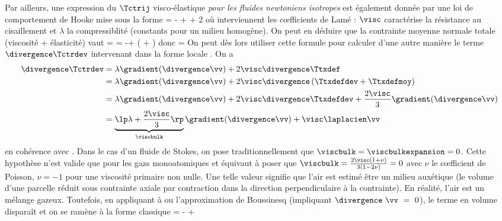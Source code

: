 Par ailleurs, une expression du $\Tctrij$ visco-élastique \emph{pour les fluides newtoniens isotropes} est également donnée par une loi de comportement de Hooke mise sous la forme
\beq \Tctrij = - \kro \pression + \lambda \kro \Ttxdefkk + 2 \visc \Ttxdefij \eeq
où interviennent les cœfficients de Lamé : $\visc$ caractérise la résistance au cisaillement et $\lambda$ la compressiblité (constants pour un milieu homogène). On peut en déduire que la contrainte moyenne normale totale (viscosité + élasticité) vaut
\beq \Tctrmoy =  = -\pression + \left ( \lambda +  \visc \right ) \Ttxdefkk \eeq
donc \beq \viscbulk = \viscbulkexpansion \eeq
On peut dès lors utiliser cette formule pour calculer d'une autre manière le terme $\divergence \Tctrdev$ intervenant dans la forme locale . On a
\begin{align}
\divergence \Tctrdev
  & = \lambda \gradient ( \divergence \vv) + 2 \visc \divergence \Ttxdef \notag \\
  & = \lambda \gradient ( \divergence \vv) + 2 \visc \divergence \left ( \Ttxdefdev + \Ttxdefmoy \right ) \notag \\
  & = \lambda \gradient ( \divergence \vv) + 2 \visc \divergence \Ttxdefdev + \frac{2\visc}{3} \gradient ( \divergence \vv ) \notag \\
  & = \underbrace{\lp \lambda + \frac{2\visc}{3} \rp}_{\viscbulk} \gradient ( \divergence \vv) + \visc \laplacien \vv \label{eq:dynamique-finale}
\end{align}
en cohérence avec .
Dans le cas d'un fluide de Stokes, on pose traditionnellement que $\viscbulk = \viscbulkexpansion = 0$.
Cette hypothèse n'est valide que pour les gazs monoatomiques et équivaut à poser que $\viscbulk = \frac{2 \visc(1 + \nu)}{3(1 - 2\nu)} = 0$ avec $\nu$ le cœfficient de Poisson, \ie $\nu = -1$ pour une viscosité primaire non nulle. Une telle valeur signifie que l'air est estimé être un milieu auxétique (le volume d'une parcelle réduit sous contrainte axiale par contraction dans la direction perpendiculaire à la contrainte). En réalité, l'air est un mélange gazeux. Toutefois, en appliquant à  ou  l'approximation de Boussinesq (impliquant $\divergence~\vv~=~0$), le terme en volume disparaît et on se ramène à la forme classique
\beq \rho \dt{\vv} = \visc \laplacien \vv - \gradient \pression + \rho \vg  \eeq

